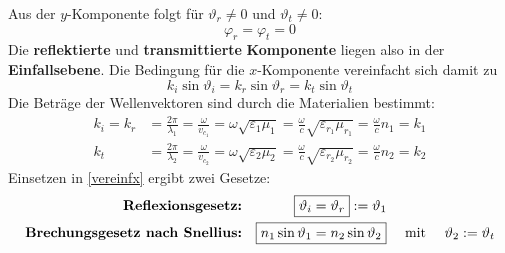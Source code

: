 		   Aus der \(y\)-Komponente folgt für \(\vartheta_r\ne 0\) und \(\vartheta_t\ne 0\): \begin{equation}
		   	\boxed{\varphi_r=\varphi_t=0}
		   \end{equation} 
		   Die \textbf{reflektierte} und \textbf{transmittierte} \textbf{Komponente} liegen also in der \textbf{Einfallsebene}.
		  Die Bedingung für die \(x\)-Komponente vereinfacht sich damit zu
		        \begin{equation}\label{vereinfx}
			        k_i\sin\vartheta_i =  k_r\sin\vartheta_r = k_t\sin\vartheta_t
		        \end{equation}
		  Die Beträge der Wellenvektoren sind durch die Materialien bestimmt:
		        \begin{equation}\begin{split}
				        k_i =  k_r &= \frac{2\pi}{\lambda_1} = \frac{\omega}{ v_{c_1}} = \omega\sqrt{\varepsilon_1\mu_1} = \frac{\omega}{c}\sqrt{\varepsilon_{r_1}\mu_{r_1}} = \frac{\omega}{c} n_1 = k_1\\
				        k_t &= \frac{2\pi}{\lambda_2} = \frac{\omega}{ v_{c_2}} = \omega\sqrt{\varepsilon_2\mu_2} = \frac{\omega}{c}\sqrt{\varepsilon_{r_2}\mu_{r_2}} = \frac{\omega}{c} n_2 = k_2
			        \end{split}\end{equation}
		  Einsetzen in \ref{vereinfx} ergibt zwei Gesetze:
\begin{align}
	\textbf{Reflexionsgesetz:} & & \Aboxed{\vartheta_i&=\vartheta_r}:=\vartheta_1\\
	\textbf{Brechungsgesetz nach Snellius:} & & \Aboxed{ n_1\sin\vartheta_1 &= n_2\sin\vartheta_2}\quad \text{ mit } \quad\vartheta_2:=\vartheta_t\label{snellius}
\end{align}
